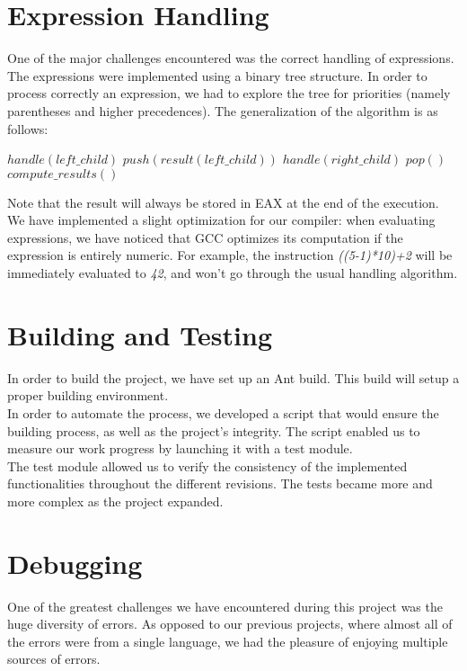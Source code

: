 \documentclass{scrartcl}
\begin{document}
\section{Expression Handling}
One of the major challenges encountered was the correct handling of expressions.
The expressions were implemented using a binary tree structure. In order to process correctly an expression, we had to explore the tree for priorities (namely parentheses and higher precedences). The generalization of the algorithm is as follows:
\vspace{0.5cm}
\begin{algorithmic}
\State $handle(left\_child)$
\State $push(result(left\_child))$
\State $handle(right\_child)$
\State $pop()$
\State $compute\_results()$
\EndIf
\end{algorithmic}
\vspace{0.5cm}
Note that the result will always be stored in EAX at the end of the execution.\\

We have implemented a slight optimization for our compiler: when evaluating expressions, we have noticed that GCC optimizes its computation if the expression is entirely numeric. For example, the instruction \emph{((5-1)*10)+2} will be immediately evaluated to \emph{42}, and won't go through the usual handling algorithm.

\section{Building and Testing}
In order to build the project, we have set up an Ant build. This build will setup a proper building environment.\\
In order to automate the process, we developed a script that would ensure the building process, as well as the project's integrity. The script enabled us to measure our work progress by launching it with a test module.\\
The test module allowed us to verify the consistency of the implemented functionalities throughout the different revisions. The tests became more and more complex as the project expanded.

\section{Debugging}
One of the greatest challenges we have encountered during this project was the huge diversity of errors. As opposed to our previous projects, where almost all of the errors were from a single language, we had the pleasure of enjoying multiple sources of errors.\\
\end{document}
